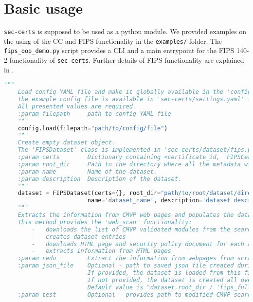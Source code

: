 \section*{Basic usage}

\texttt{sec-certs} is supposed to be used as a python module. We provided examples on the using of the CC and FIPS functionality in the \texttt{examples/} folder. The \texttt{fips\_oop\_demo.py} script provides a CLI and a main entrypoint for the FIPS 140-2 functionality of \texttt{sec-certs}. Further details of FIPS functionality are explained in .

\begin{lstlisting}[language=python,caption=Example of using FIPS 140-2 functionality of \texttt{sec-certs}, label={code}]
    """
    Load config YAML file and make it globally available in the 'config' variable. 
    The example config file is available in 'sec-certs/settings.yaml' file. 
    All presented values are required.
    :param filepath     path to config YAML file
    """
    config.load(filepath="path/to/config/file")
    """
    Create empty dataset object. 
    The 'FIPSDataset' class is implemented in 'sec-certs/dataset/fips.py'.
    :param certs        Dictionary containing <certificate_id, 'FIPSCertificate'> pairs.
    :param root_dir     Path to the directory where all the metadata will be saved. 
    :param name         Name of the dataset.
    :param description  Description of the dataset.
    """
    dataset = FIPSDataset(certs={}, root_dir="path/to/root/dataset/directory", 
                        name='dataset_name', description='dataset description')
    """
    Extracts the information from CMVP web pages and populates the dataset.
    This method provides the 'web_scan' functionality:
        -   downloads the list of CMVP validated modules from the search pages
        -   creates dataset entries
        -   downloads HTML page and security policy document for each available module
        -   extracts information from HTML pages
    :param redo         Extract the information from webpages from scratch.
    :param json_file    Optional - path to saved json file created during previous calculations. 
                        If provided, the dataset is loaded from this file and is only updated.
                        If not provided, the dataset is created all over again.
                        Default value is "dataset.root_dir / 'fips_full_dataset.json'"
    :param test         Optional - provides path to modified CMVP search page, used only in tests to check whether the functionality is correct for a subset of all certificates.

\end{lstlisting}
